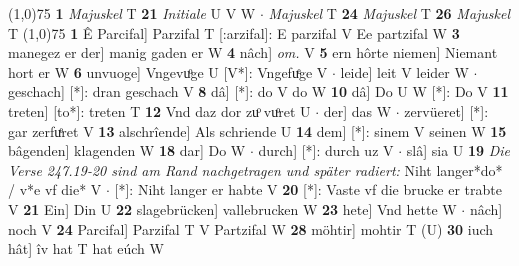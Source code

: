 \documentclass[8pt,a4paper,notitlepage]{article}
\begin{document}
\begin{table}[ht]
\begin{minipage}[t]{0.5\linewidth}
\line(1,0){75} \newline
\textbf{1} \textit{Majuskel} T  \textbf{21} \textit{Initiale} U V W   $\cdot$ \textit{Majuskel} T  \textbf{24} \textit{Majuskel} T  \textbf{26} \textit{Majuskel} T  \newline
\line(1,0){75} \newline
\textbf{1} Ê Parcifal] Parzifal T [:arzifal]: E parzifal V Ee partzifal W \textbf{3} manegez er der] manig gaden er W \textbf{4} nâch] \textit{om.} V \textbf{5} ern hôrte niemen] Niemant hort er W \textbf{6} unvuoge] Vngevuͦge U [V*]: Vngefuͤge V  $\cdot$ leide] leit V leider W  $\cdot$ geschach] [*]: dran geschach V \textbf{8} dâ] [*]: do V do W \textbf{10} dâ] Do U W [*]: Do V \textbf{11} treten] [to*]: treten T \textbf{12} Vnd daz dor zuͦ vuͦret U  $\cdot$ der] das W  $\cdot$ zervüeret] [*]: gar zerfuͤret V \textbf{13} alschrîende] Als schriende U \textbf{14} dem] [*]: sinem V seinen W \textbf{15} bâgenden] klagenden W \textbf{18} dar] Do W  $\cdot$ durch] [*]: durch uz V  $\cdot$ slâ] sia U \textbf{19} \textit{Die Verse 247.19-20 sind am Rand nachgetragen und später radiert:} Niht langer*do* / v*e vf die* V   $\cdot$ [*]: Niht langer er habte V \textbf{20} [*]: Vaste vf die brucke er trabte V \textbf{21} Ein] Din U \textbf{22} slagebrücken] vallebrucken W \textbf{23} hete] Vnd hette W  $\cdot$ nâch] noch V \textbf{24} Parcifal] Parzifal T V Partzifal W \textbf{28} möhtir] mohtir T (U) \textbf{30} iuch hât] îv hat T hat eúch W \newline
\end{minipage}
\end{table}
\end{document}
